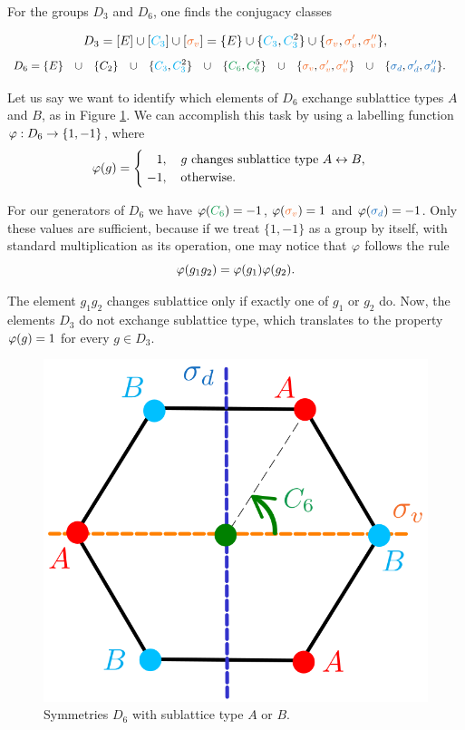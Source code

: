 \begin{example} \label{ex:conjclass_example_D3D6}
For the groups $D_3$ and $D_6$, one finds the conjugacy classes

\begin{equation} \label{eq:D3_classes}
D_3 = [E] \cup [\Ct] \cup [\sv] = \{E\} \cup \{\Ct, \Ctn{2}\} \cup \{\sv, \svp, \svpp\},
\end{equation}
\begin{align} \label{eq:D6_classes}
D_6 &= \{E\} &&\cup&& \{C_2\} &&\cup&& \{\Ct, \Ctn{2}\} &&\cup&& \{\Cs, \Csn{5}\} &&\cup&& \{\sv, \svp, \svpp\} &&\cup&& \{\sd, \sdp, \sdpp\}.
\end{align}
\end{example}

\begin{example} \label{ex:homomorphism_sublattice_AB_example}
Let us say we want to identify which elements of $D_6$ exchange sublattice types $A$ and $B$, as in Figure \ref{fig:hexagon_AB}. We can accomplish this task by using a labelling function $\varphi: D_6 \to \{1, -1\}$, where
\begin{align} \label{eq:homomorphism_example_sublattices_AB_D6}
\vphi(g) =
\begin{cases}
\; \P1, \quad g \text{ changes sublattice type } A \leftrightarrow B, \\
\; -1, \quad \text{otherwise.}
\end{cases}
\end{align}

For our generators of $D_6$ we have $\vphi(\Cs) = -1$, $\vphi(\sv) = 1$ and $\vphi(\sd) = -1$. Only these values are sufficient, because if we treat $\{1, -1\}$ as a group by itself, with standard multiplication as its operation, one may notice that $\varphi$ follows the rule
\begin{equation} \label{eq:vphi_g1g2_homomophism}
\varphi(g_1 g_2) = \varphi(g_1) \varphi(g_2).
\end{equation}

The element $g_1 g_2$ changes sublattice only if exactly one of $g_1$ or $g_2$ do. Now, the elements $D_3$ do not exchange sublattice type, which translates to the property $\varphi(g) = 1$ for every $g \in D_3$.
\end{example}

\begin{figure}[H]
\centering
\includegraphics[width=0.4\linewidth]{fig/hexagon_AB.png}
\caption{Symmetries $D_6$ with sublattice type $A$ or $B$.}
\label{fig:hexagon_AB}
\end{figure}



